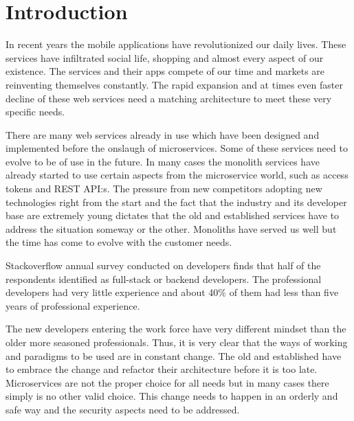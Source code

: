

\section{Introduction}
\begin{sloppypar}
    In recent years the mobile applications have revolutionized our daily lives. 
    These services have infiltrated social life, shopping and almost every 
    aspect of our existence. The services and their apps compete of our time and
    markets are reinventing themselves constantly. The rapid expansion and at 
    times even faster decline of these web services need a matching architecture 
    to meet these very specific needs. 
\end{sloppypar}
\begin{sloppypar}
    There are many web services already in use which have been designed and 
    implemented before the onslaugh of microservices. Some of these services 
    need to evolve to be of use in the future. In many cases the monolith 
    services have already started to use certain aspects from the microservice 
    world, such as access tokens and REST API:s. The pressure from new 
    competitors adopting new technologies right from the start and the fact 
    that the industry and its developer base are extremely young dictates that 
    the old and established services have to address the situation someway or 
    the other. Monoliths have served us well but the time has come to evolve 
    with the customer needs.
\end{sloppypar}
\begin{sloppypar}
    Stackoverflow annual survey \citep{sosurvey2019} conducted on 
    developers finds that half of the respondents identified as full-stack or 
    backend developers. The professional developers had very little experience 
    and about 40\% of them had less than five years of professional experience. 
\end{sloppypar}
\begin{sloppypar}
    The new developers entering the work force have very different mindset than 
    the older more seasoned professionals. Thus, it is very clear that the ways 
    of working and paradigms to be used are in constant change. The old and 
    established have to embrace the change and refactor their architecture 
    before it is too late. Microservices are not the proper choice for all needs
     \citep{newman2019} but in many cases there simply is no other valid choice.
    This change needs to happen in an orderly and safe way and the security 
    aspects need to be addressed. 
\end{sloppypar}
